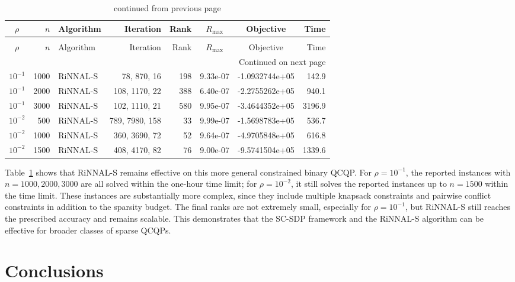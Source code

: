 \documentclass[11pt]{article}
\theoremstyle{plain}
\begin{document}
\small
\begin{longtable}{crlrrccr}
\caption{Computational results for the SC-SDP relaxation of \eqref{eq:sqkp-conflict-model}.}
\label{tab:sqkp-conflict-results}\\
\toprule
$\rho$ & $n$ & Algorithm & Iteration & Rank & $R_{\max}$ & Objective & Time \\
\midrule
\endfirsthead
\caption[]{continued from previous page}\\
\toprule
$\rho$ & $n$ & Algorithm & Iteration & Rank & $R_{\max}$ & Objective & Time \\
\midrule
\endhead
\midrule
\multicolumn{8}{r}{Continued on next page}\\
\endfoot
\bottomrule
\endlastfoot
$10^{-1}$ & 1000 & RiNNAL-S & 78, 870, 16 & 198 & 9.33e-07 & -1.0932744e+05 & 142.9 \\*
$10^{-1}$ & 2000 & RiNNAL-S & 108, 1170, 22 & 388 & 6.40e-07 & -2.2755262e+05 & 940.1 \\*
$10^{-1}$ & 3000 & RiNNAL-S & 102, 1110, 21 & 580 & 9.95e-07 & -3.4644352e+05 & 3196.9 \\
\midrule
$10^{-2}$ & 500 & RiNNAL-S & 789, 7980, 158 & 33 & 9.99e-07 & -1.5698783e+05 & 536.7 \\*
$10^{-2}$ & 1000 & RiNNAL-S & 360, 3690, 72 & 52 & 9.64e-07 & -4.9705848e+05 & 616.8 \\*
$10^{-2}$ & 1500 & RiNNAL-S & 408, 4170, 82 & 76 & 9.00e-07 & -9.5741504e+05 & 1339.6 \\
\end{longtable}
\normalsize

Table~\ref{tab:sqkp-conflict-results} shows that RiNNAL-S remains effective on
this more general constrained binary QCQP. For \(\rho=10^{-1}\), the reported
instances with \(n=1000,2000,3000\) are all solved within the one-hour time limit; for \(\rho=10^{-2}\),
it still solves the reported instances up to \(n=1500\) within the time limit. These instances are
substantially more complex, since they include multiple knapsack
constraints and pairwise conflict constraints in addition to the sparsity
budget. The final ranks are not extremely small, especially for
\(\rho=10^{-1}\), but RiNNAL-S still reaches the prescribed accuracy and remains
scalable. This demonstrates that the SC-SDP framework and the RiNNAL-S algorithm can be effective for broader classes of sparse QCQPs.


\section{Conclusions}
\end{document}
